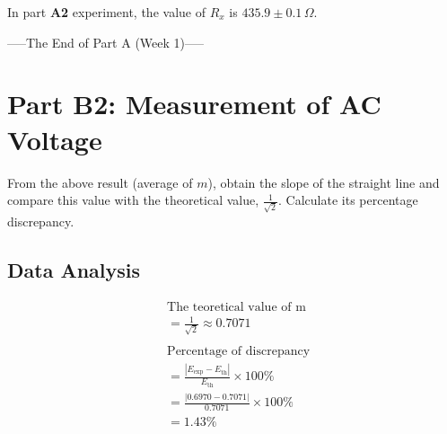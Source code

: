 \documentclass[twocolumn,a4paper,11pt]{article}
\begin{document}
In part \textbf{A2} experiment, the value of $R_x$ is $435.9 \pm 0.1\,\Omega$.\vfill
\begin{center}
-----The End of Part A (Week 1)-----
\end{center}
\newpage
\section*{Part B2: Measurement of AC Voltage}
\begin{table}[h!]
\caption{Peak voltage versus RMS voltage}
\label{tab:peak_rms_voltage}
\end{table}
\noindent From the above result (average of \( m \)), obtain the slope of the straight line and compare this value with the theoretical value, \( \frac{1}{\sqrt{2}} \). Calculate its percentage discrepancy.
\subsection*{Data Analysis}
\begin{align*}
&\text{The teoretical value of m}\\
&=\frac{1}{\sqrt{2}} \approx 0.7071\\
\\
&\text{Percentage of discrepancy} \\
&= \frac{|E_{\text{exp}} - E_{\text{th}}|}{E_{\text{th}}} \times 100\% \\
&= \frac{|0.6970 - 0.7071|}{0.7071} \times 100\%\\
&= 1.43 \%
\end{align*}
\newpage
\end{document}
